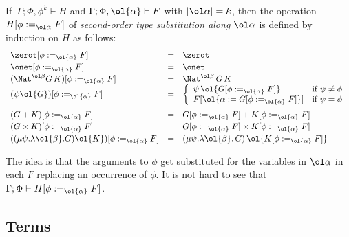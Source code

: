 \documentclass{lmcs}
\theoremstyle{plain}\newtheorem{satz}[thm]{Satz}
\begin{document}
\begin{defi}\label{def:second-order-subst}
If \,$\Gamma; \Phi,\phi^k \vdash H$ and $\Gamma;\Phi, \ol{\alpha}
\vdash F$ with $|\ol\alpha| = k$, then the operation $H[\phi :=_{\ol
    \alpha} F]$ of {\em second-order type substitution along
  $\ol\alpha$} is defined by induction on $H$ as follows:
\[\begin{array}{lll}
\zerot[\phi :=_{\ol{\alpha}} F] & = & \zerot\\[0.5ex]
\onet[\phi :=_{\ol{\alpha}} F] & = & \onet\\[0.25ex]
(\Nat^{\ol\beta} G \,K)[\phi :=_{\ol{\alpha}} F]
& = & \Nat^{\ol\beta}\, G \,K\\
(\psi\ol{G})[\phi :=_{\ol{\alpha}} F] & = &
\left\{\begin{array}{ll}
\psi \,\ol{G[\phi :=_{\ol{\alpha}} F]} & \mbox{if } \psi \not = \phi\\
  F[\ol{\alpha  := G[\phi :=_{\ol{\alpha}} F]}] 
  & \mbox{if } \psi = \phi
\end{array}\right.\\[2.8ex]
(G + K)[\phi :=_{\ol{\alpha}} F] & = & G[\phi
  :=_{\ol{\alpha}} F] + K[\phi :=_{\ol{\alpha}} F]\\[0.5ex] 
(G \times K)[\phi :=_{\ol{\alpha}} F] & = &
G[\phi :=_{\ol{\alpha}} F] \times K[\phi
  :=_{\ol{\alpha}} F]\\[0.5ex]   
((\mu \psi. \lambda \ol{\beta}. G)\ol{K})[\phi :=_{\ol{\alpha}}
  F] & = & (\mu \psi. \lambda \ol{\beta}. \,G)\, \ol{K[\phi :=_{\ol{\alpha}} F]}
\end{array}\]
\end{defi}
\noindent
The idea is that the arguments to $\phi$ get substituted for the
variables in $\ol\alpha$ in each $F$ replacing an occurrence of
$\phi$. It is not hard to see that $\Gamma;\Phi \vdash H[\phi
  :=_{\ol{\alpha}} F]$. 

\subsection{Terms}\label{sec:terms}
\end{document}
